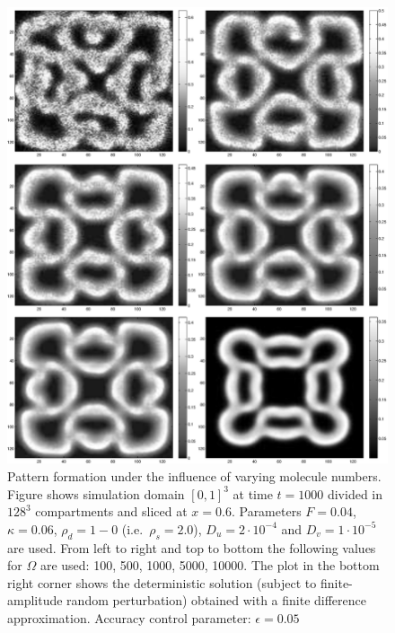 \begin{figure}
\centering
\includegraphics[width=\textwidth]{images/pattern.eps}
\caption{Pattern formation under the influence of varying molecule numbers. Figure shows simulation domain $[0,1]^3$ at time $t=1000$ divided in $128^3$ compartments and sliced at $x=0.6$. Parameters $F=0.04$, $\kappa = 0.06$, $\rho_d = 1-0$ (i.e.\ $\rho_s = 2.0$), $D_u = 2\cdot 10^{-4}$ and $D_v = 1\cdot 10^{-5}$ are used. From left to right and top to bottom the following values for $\Omega$ are used: 100, 500, 1000, 5000, 10000. The plot in the bottom right corner shows the deterministic solution (subject to finite-amplitude random perturbation) obtained with a finite difference approximation. Accuracy control parameter: $\epsilon = 0.05$}
\label{fig:pattern}
\end{figure}